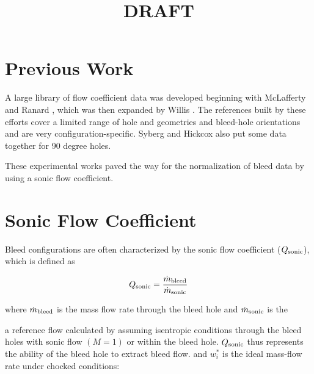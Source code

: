 \documentclass{article}
\begin{document}
\ifdraft
	\title{DRAFT}
	\maketitle
\else
\frontmatter
\fi

	\tableofcontents

\ifdraft
\else
\mainmatter
\fi

\pagebreak
\section{Previous Work}


A large library of flow coefficient data was developed beginning with McLafferty and Ranard \cite{McLafferty1958}, which was then expanded by Willis \cite{Willis1995}. The references built by these efforts cover a limited range of hole and geometries and bleed-hole orientations and are very configuration-specific. Syberg and Hickcox \cite{Syberg1973b} also put some data together for 90 degree holes.

These experimental works paved the way for the normalization of bleed data by using a sonic flow coefficient.


\section{Sonic Flow Coefficient}

Bleed configurations are often characterized by the sonic flow coefficient ($Q_{\textrm{sonic}}$), which is defined as

$$ Q_{\textrm{sonic}} = \frac{\dot{m}_{\textrm{bleed}}}{\dot{m}_{\textrm{sonic}}} $$


where $\dot{m}_{\textrm{bleed}}$ is the mass flow rate through the bleed hole and $\dot{m}_{\textrm{sonic}}$ is the 

a reference flow calculated by assuming isentropic conditions through the bleed holes with sonic flow $(M=1)$ or within the bleed hole. $Q_{\textrm{sonic}}$ thus represents the ability of the bleed hole to extract bleed flow.
and $w_i^*$ is the ideal mass-flow rate under chocked conditions:
\end{document}
